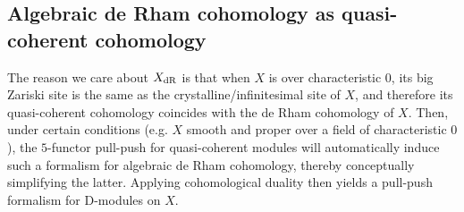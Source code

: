     \subsection{Algebraic de Rham cohomology as quasi-coherent cohomology}
        The reason we care about $X_{\mathrm{dR}}$ is that when $X$ is over characteristic $0$, its big Zariski site is the same as the crystalline/infinitesimal site of $X$, and therefore its quasi-coherent cohomology coincides with the de Rham cohomology of $X$. Then, under certain conditions (e.g. $X$ smooth and proper over a field of characteristic $0$), the $5$-functor pull-push for quasi-coherent modules will automatically induce such a formalism for algebraic de Rham cohomology, thereby conceptually simplifying the latter. Applying cohomological duality then yields a pull-push formalism for D-modules on $X$.